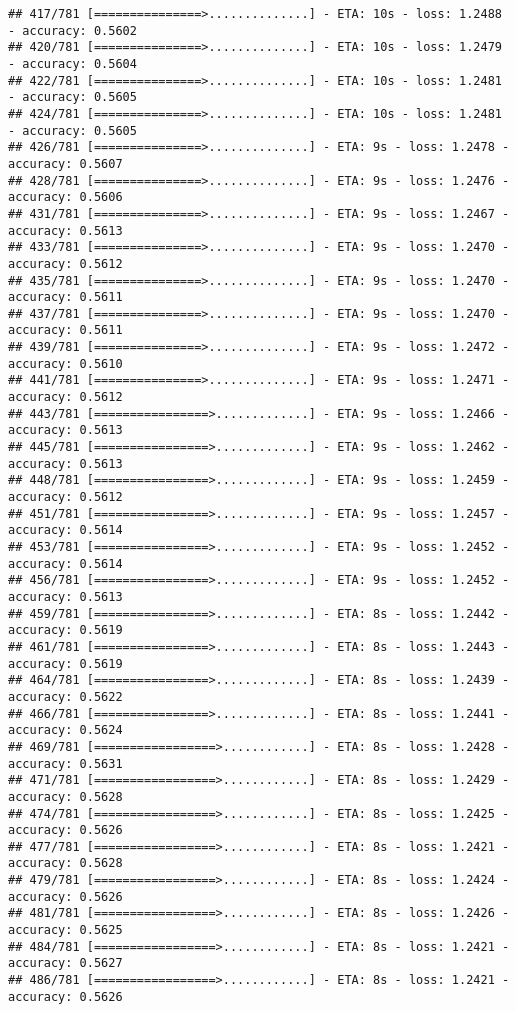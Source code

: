 \documentclass[
]{article}
\begin{document}
\begin{verbatim}
## 417/781 [===============>..............] - ETA: 10s - loss: 1.2488 - accuracy: 0.5602
## 420/781 [===============>..............] - ETA: 10s - loss: 1.2479 - accuracy: 0.5604
## 422/781 [===============>..............] - ETA: 10s - loss: 1.2481 - accuracy: 0.5605
## 424/781 [===============>..............] - ETA: 10s - loss: 1.2481 - accuracy: 0.5605
## 426/781 [===============>..............] - ETA: 9s - loss: 1.2478 - accuracy: 0.5607 
## 428/781 [===============>..............] - ETA: 9s - loss: 1.2476 - accuracy: 0.5606
## 431/781 [===============>..............] - ETA: 9s - loss: 1.2467 - accuracy: 0.5613
## 433/781 [===============>..............] - ETA: 9s - loss: 1.2470 - accuracy: 0.5612
## 435/781 [===============>..............] - ETA: 9s - loss: 1.2470 - accuracy: 0.5611
## 437/781 [===============>..............] - ETA: 9s - loss: 1.2470 - accuracy: 0.5611
## 439/781 [===============>..............] - ETA: 9s - loss: 1.2472 - accuracy: 0.5610
## 441/781 [===============>..............] - ETA: 9s - loss: 1.2471 - accuracy: 0.5612
## 443/781 [================>.............] - ETA: 9s - loss: 1.2466 - accuracy: 0.5613
## 445/781 [================>.............] - ETA: 9s - loss: 1.2462 - accuracy: 0.5613
## 448/781 [================>.............] - ETA: 9s - loss: 1.2459 - accuracy: 0.5612
## 451/781 [================>.............] - ETA: 9s - loss: 1.2457 - accuracy: 0.5614
## 453/781 [================>.............] - ETA: 9s - loss: 1.2452 - accuracy: 0.5614
## 456/781 [================>.............] - ETA: 9s - loss: 1.2452 - accuracy: 0.5613
## 459/781 [================>.............] - ETA: 8s - loss: 1.2442 - accuracy: 0.5619
## 461/781 [================>.............] - ETA: 8s - loss: 1.2443 - accuracy: 0.5619
## 464/781 [================>.............] - ETA: 8s - loss: 1.2439 - accuracy: 0.5622
## 466/781 [================>.............] - ETA: 8s - loss: 1.2441 - accuracy: 0.5624
## 469/781 [=================>............] - ETA: 8s - loss: 1.2428 - accuracy: 0.5631
## 471/781 [=================>............] - ETA: 8s - loss: 1.2429 - accuracy: 0.5628
## 474/781 [=================>............] - ETA: 8s - loss: 1.2425 - accuracy: 0.5626
## 477/781 [=================>............] - ETA: 8s - loss: 1.2421 - accuracy: 0.5628
## 479/781 [=================>............] - ETA: 8s - loss: 1.2424 - accuracy: 0.5626
## 481/781 [=================>............] - ETA: 8s - loss: 1.2426 - accuracy: 0.5625
## 484/781 [=================>............] - ETA: 8s - loss: 1.2421 - accuracy: 0.5627
## 486/781 [=================>............] - ETA: 8s - loss: 1.2421 - accuracy: 0.5626

\end{verbatim}
\end{document}
